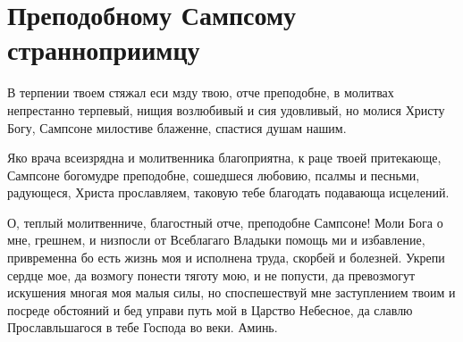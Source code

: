 \mychapterending


\section{Преподобному Сампсому странноприимцу}\begin{mymulticols}


В терпении твоем стяжал еси мзду твою, отче преподобне, в молитвах непрестанно терпевый, нищия возлюбивый и сия удовливый, но молися Христу Богу, Сампсоне милостиве блаженне, спастися душам нашим.


Яко врача всеизрядна и молитвенника благоприятна, к раце твоей притекающе, Сампсоне богомудре преподобне, сошедшеся любовию, псалмы и песньми, радующеся, Христа прославляем, таковую тебе благодать подавающа исцелений.


О, теплый молитвенниче, благостный отче, преподобне Сампсоне! Моли Бога о мне, грешнем, и низпосли от Всеблагаго Владыки помощь ми и избавление, привременна бо есть жизнь моя и исполнена труда, скорбей и болезней. Укрепи сердце мое, да возмогу понести тяготу мою, и не попусти, да превозмогут искушения многая моя малыя силы, но споспешествуй мне заступлением твоим и посреде обстояний и бед управи путь мой в Царство Небесное, да славлю Прославльшагося в тебе Господа во веки. Аминь.

\end{mymulticols}

